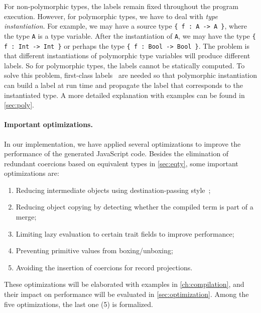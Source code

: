 For non-polymorphic types, the labels remain fixed throughout the program
execution. However, for polymorphic types, we have to deal with \emph{type
instantiation}. For example, we may have a source type \lstinline|{ f : A -> A }|,
where the type \lstinline|A| is a type variable. After the instantiation of
\lstinline|A|, we may have the type \lstinline|{ f : Int -> Int }| or perhaps
the type \lstinline|{ f : Bool -> Bool }|. The problem is that different
instantiations of polymorphic type variables will produce different labels. So
for polymorphic types, the labels cannot be statically computed. To solve this
problem, first-class labels~\citep{leijen2004first} are needed so that
polymorphic instantiation can build a label at run time and propagate the label
that corresponds to the instantiated type. A more detailed explanation with
examples can be found in \autoref{sec:poly}.

\paragraph{Important optimizations.}
In our implementation, we have applied several optimizations to improve the
performance of the generated JavaScript code. Besides the elimination of
redundant coercions based on equivalent types in \autoref{sec:eqty}, some
important optimizations are:
\begin{enumerate}
\item Reducing intermediate objects using destination-passing
      style~\citep{shaikhha2017destination};
\item Reducing object copying by detecting whether the compiled term is part of
      a merge;
\item Limiting lazy evaluation to certain trait fields to improve performance;
\item Preventing primitive values from boxing/unboxing;
\item Avoiding the insertion of coercions for record projections.
\end{enumerate}
These optimizations will be elaborated with examples in
\autoref{ch:compilation}, and their impact on performance will be evaluated in
\autoref{sec:optimization}. Among the five optimizations, the last one (5) is
formalized.
